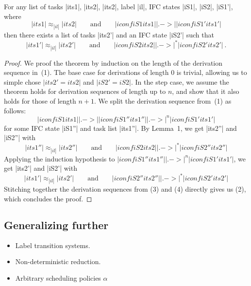 \begin{lemma}
  For any list of tasks |its1|, |its2|, |its2|, label |il|,
  IFC states |iS1|, |iS2|, |iS1'|, where
  \begin{equation} \label{eq:tsni-lhs}
  |its1| \approx_{|il|} |its2|
  \qquad \text{and} \qquad
  |iconf iS1 its1| |.->| |iconf iS1' its1'|
  \end{equation}
  then there exists a list of tasks |its2'| and an IFC state |iS2'| such that
  \begin{equation} \label{eq:tsni-rhs}
  |its1'| \approx_{|il|} |its2'|
  \qquad \text{and} \qquad
  |iconf iS2 its2| |.->|^* |iconf iS2' its2'|
  \ \text{.}
  \end{equation}
\end{lemma}

\begin{proof}
  We proof the theorem by induction on the length of the derivation sequence in~(1).
  The base case for derivations
  of length 0 is trivial, allowing
  us to simple chose $|its2'=its2|$ and $|iS2'=iS2|$.  In the step case, we assume
  the theorem holds for derivation sequences of length up to $n$, and show that it also
  holds for those of length $n+1$.  We split the derivation sequence from~(1) as follows:
  \[
  |iconf iS1 its1| |.->| |iconf iS1'' its1''| |.->|^n |iconf iS1' its1'|
  \]
  for some IFC state |iS1''| and task list |its1''|.  By Lemma~1, we get
  |its2''| and |iS2''| with
  \begin{equation} \label{eq:tsni-proof-1}
  |its1''| \approx_{|il|} |its2''|
  \qquad \text{and} \qquad
  |iconf iS2 its2| |.->|^* |iconf iS2'' its2''|
  \end{equation}
  Applying the induction hypothesis to
  $|iconf iS1'' its1''| |.->|^n |iconf iS1' its1'|$, we get |its2'| and |iS2'| with
  \begin{equation} \label{eq:tsni-proof-2}
  |its1'| \approx_{|il|} |its2'|
  \qquad \text{and} \qquad
  |iconf iS2'' its2''| |.->|^* |iconf iS2' its2'|
  \end{equation}
  Stitching together the derivation sequences from (3) and (4) directly gives
  us (2), which concludes the proof.
\end{proof}

\subsection{Generalizing further}

\begin{itemize}
\item Label transition systems.
\item Non-deterministic reduction.
\item Arbitrary scheduling policies $\alpha$
\end{itemize}












